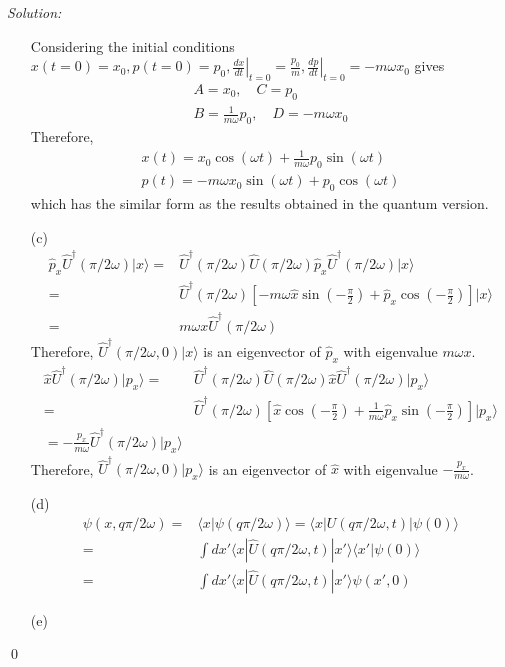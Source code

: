 \documentclass[12pt,a4paper]{article}
\newenvironment{sol}
    {\emph{Solution:}
    }
    {
    \qed
    }
\begin{document}
\begin{sol}
\begin{itemize}
Considering the initial conditions $x(t=0)=x_0,p(t=0)=p_0,\left.\frac{dx}{dt}\right|_{t=0}=\frac{p_0}{m},\left.\frac{dp}{dt}\right|_{t=0}=-m\omega x_0$ gives
\begin{gather}
A=x_0,\quad C=p_0\\
B=\frac{1}{m\omega}p_0,\quad D=-m\omega x_0
\end{gather}
Therefore,
\begin{gather}
x(t)=x_0\cos(\omega t)+\frac{1}{m\omega}p_0\sin(\omega t)\\
p(t)=-m\omega x_0\sin(\omega t)+p_0\cos(\omega t)
\end{gather}
which has the similar form as the results obtained in the quantum version.
\item[(c)]
\begin{align}
\nonumber\hat{p}_x\hat{U}^{\dagger}(\pi/2\omega)|x\rangle=&\hat{U}^{\dagger}(\pi/2\omega)\hat{U}(\pi/2\omega)\hat{p}_x\hat{U}^{\dagger}(\pi/2\omega)|x\rangle\\
\nonumber=&\hat{U}^{\dagger}(\pi/2\omega)[-m\omega\hat{x}\sin(-\frac{\pi}{2})+\hat{p}_x\cos(-\frac{\pi}{2})]|x\rangle\\
\nonumber=&m\omega x\hat{U}^{\dagger}(\pi/2\omega)
\end{align}
Therefore, $\hat{U}^{\dagger}(\pi/2\omega,0)|x\rangle$ is an eigenvector of $\hat{p}_x$ with eigenvalue $m\omega x$.
\begin{align}
\nonumber\hat{x}\hat{U}^{\dagger}(\pi/2\omega)|p_x\rangle=&\hat{U}^{\dagger}(\pi/2\omega)\hat{U}(\pi/2\omega)\hat{x}\hat{U}^{\dagger}(\pi/2\omega)|p_x\rangle\\
\nonumber=&\hat{U}^{\dagger}(\pi/2\omega)[\hat{x}\cos(-\frac{\pi}{2})+\frac{1}{m\omega}\hat{p}_x\sin(-\frac{\pi}{2})]|p_x\rangle\\
=-\frac{p_x}{m\omega}\hat{U}^{\dagger}(\pi/2\omega)|p_x\rangle
\end{align}
Therefore, $\hat{U}^{\dagger}(\pi/2\omega,0)|p_x\rangle$ is an eigenvector of $\hat{x}$ with eigenvalue $-\frac{p_x}{m\omega}$.
\item[(d)] 
\begin{align}
\nonumber\psi(x,q\pi/2\omega)=&\langle x|\psi(q\pi/2\omega)\rangle=\langle x|U(q\pi/2\omega,t)|\psi(0)\rangle\\
\nonumber=&\int dx'\langle x|\hat{U}(q\pi/2\omega,t)|x'\rangle\langle x'|\psi(0)\rangle\\
=&\int dx'\langle x|\hat{U}(q\pi/2\omega,t)|x'\rangle\psi(x',0)
\end{align}
\item[(e)] 
\end{itemize}
\end{sol}
\end{document}
